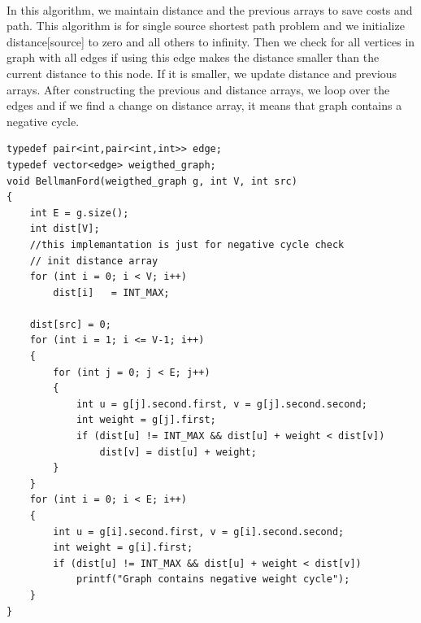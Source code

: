 \documentclass[12pt]{article}
\begin{document}
\paragraph{}
In this algorithm,  we maintain distance and the previous arrays to save costs and path. This algorithm is for single source shortest path problem and we initialize distance[source] to zero and all others to infinity. Then we check for all vertices in graph with all edges if using this edge makes the distance smaller than the current distance to this node. If it is smaller, we update distance and previous arrays. After constructing the previous and distance arrays, we loop over the edges and if we find a change on distance array, it means that graph contains a negative cycle. 

\begin{verbatim}
typedef pair<int,pair<int,int>> edge;
typedef vector<edge> weigthed_graph;
void BellmanFord(weigthed_graph g, int V, int src) 
{ 
    int E = g.size(); 
    int dist[V]; 
    //this implemantation is just for negative cycle check
    // init distance array
    for (int i = 0; i < V; i++) 
        dist[i]   = INT_MAX; 

    dist[src] = 0; 
    for (int i = 1; i <= V-1; i++) 
    { 
        for (int j = 0; j < E; j++) 
        { 
            int u = g[j].second.first, v = g[j].second.second; 
            int weight = g[j].first; 
            if (dist[u] != INT_MAX && dist[u] + weight < dist[v]) 
                dist[v] = dist[u] + weight; 
        } 
    } 
    for (int i = 0; i < E; i++) 
    { 
        int u = g[i].second.first, v = g[i].second.second; 
        int weight = g[i].first;  
        if (dist[u] != INT_MAX && dist[u] + weight < dist[v]) 
            printf("Graph contains negative weight cycle"); 
    } 
}
\end{verbatim}
\end{document}
